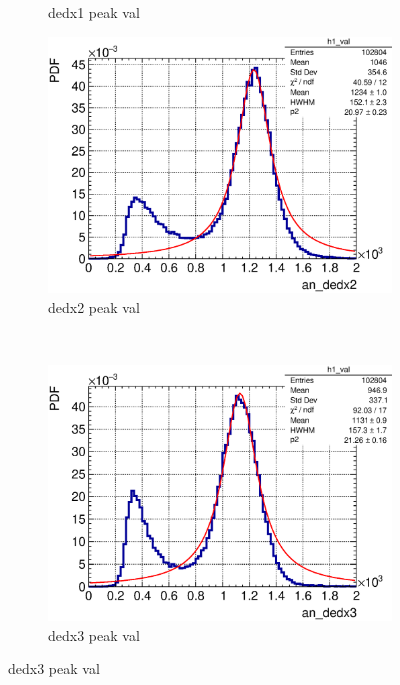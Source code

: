 \begin{figure}[t]
\begin{subfigure}{\trfigwid\textwidth}
            \caption{dedx1 peak val}
            \label{subfig:dedx1-peak}
       \end{subfigure}
       \begin{subfigure}{\trfigwid\textwidth}
            \includegraphics[width=\textwidth]{figures/sel/ans_dedx2_pdf_al2_selpr_con_test.eps}
            \caption{dedx2 peak val}
            \label{subfig:dedx2-peak}
       \end{subfigure}
       \\
       \begin{subfigure}{\trfigwid\textwidth}
            \includegraphics[width=\textwidth]{figures/sel/ans_dedx3_pdf_al2_selpr_con_test.eps}
            \caption{dedx3 peak val}
            \label{subfig:dedx3-peak}

\end{subfigure}
\end{figure}
